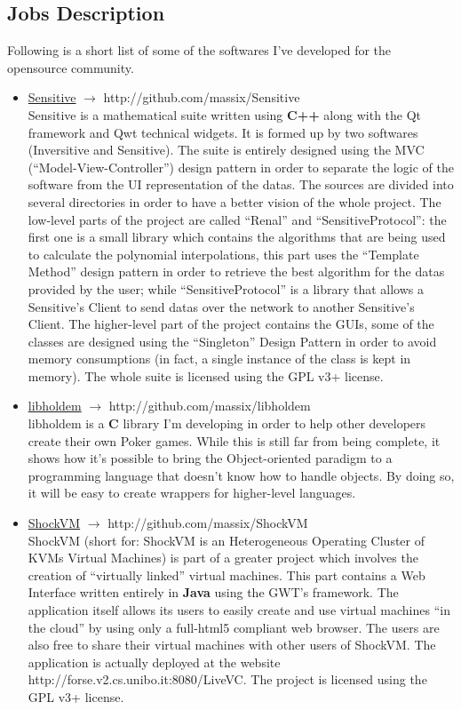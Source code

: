 \documentclass[margin]{res}
\begin{document}
\begin{resume}
\section{Jobs Description}
Following is a short list of some of the softwares I've developed for the opensource
community. 
\begin{itemize}
	\item \underline{Sensitive} $\rightarrow$ http://github.com/massix/Sensitive \\
	Sensitive is a mathematical suite written using \textbf{C++} along with the
	Qt framework and Qwt technical widgets. It is formed up by two softwares
	(Inversitive and Sensitive). The suite is entirely designed using the MVC
	(``Model-View-Controller'') design pattern in order to separate the logic
	of the software from the UI representation of the datas. The sources are
	divided into several directories in order to have a better vision of the
	whole project. The low-level parts of the project are called ``Renal'' and
	``SensitiveProtocol'': the first one is a small library which contains the
	algorithms that are being used to calculate the polynomial interpolations,
	this part uses the ``Template Method'' design pattern in order to retrieve
	the best algorithm for the datas provided by the user; while
	``SensitiveProtocol'' is a library that allows a Sensitive's Client to send
	datas over the network to another Sensitive's Client. The higher-level part
	of the project contains the GUIs, some of the classes are designed using
	the ``Singleton'' Design Pattern in order to avoid memory consumptions (in
	fact, a single instance of the class is kept in memory). The whole suite is
	licensed using the GPL v3+ license.

	\item \underline{libholdem} $\rightarrow$ http://github.com/massix/libholdem \\
	libholdem is a \textbf{C} library I'm developing in order to help other
	developers create their own Poker games. While this is still far from being
	complete, it shows how it's possible to bring the Object-oriented paradigm
	to a programming language that doesn't know how to handle objects. By doing so,
	it will be easy to create wrappers for higher-level languages.
	
	\item \underline{ShockVM} $\rightarrow$ http://github.com/massix/ShockVM \\
	ShockVM (short for: ShockVM is an Heterogeneous Operating Cluster of KVMs
	Virtual Machines) is part of a greater project which involves the creation
	of ``virtually linked'' virtual machines. This part contains a Web
	Interface written entirely in \textbf{Java} using the GWT's framework. The
	application itself allows its users to easily create and use virtual
	machines ``in the cloud'' by using only a full-html5 compliant web browser.
	The users are also free to share their virtual machines with other users of
	ShockVM. The application is actually deployed at the website
	http://forse.v2.cs.unibo.it:8080/LiveVC. The project is licensed using the
	GPL v3+ license.


\end{itemize}
\end{resume}
\end{document}
